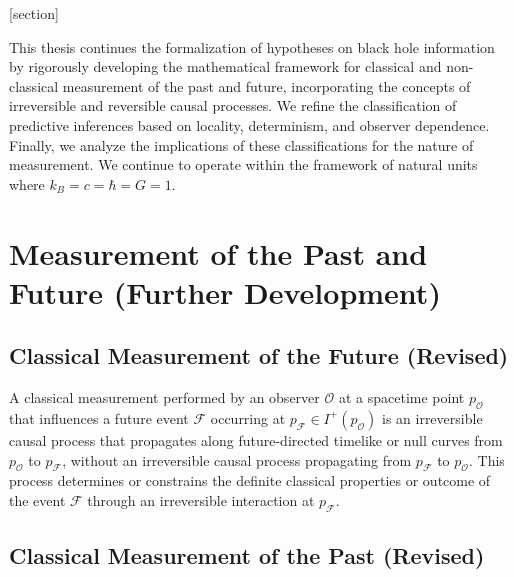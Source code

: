 





\theoremstyle{definition}
[section]
















	
	
		This thesis continues the formalization of hypotheses on black hole information by rigorously developing the mathematical framework for classical and non-classical measurement of the past and future, incorporating the concepts of irreversible and reversible causal processes. We refine the classification of predictive inferences based on locality, determinism, and observer dependence. Finally, we analyze the implications of these classifications for the nature of measurement. We continue to operate within the framework of natural units where $k_B = c = \hbar = G = 1$.

	
	\section{Measurement of the Past and Future (Further Development)}
	
	\subsection{Classical Measurement of the Future (Revised)}
	
	\begin{definition}
		A classical measurement performed by an observer $\mathcal{O}$ at a spacetime point $p_{\mathcal{O}}$ that influences a future event $\mathcal{F}$ occurring at $p_{\mathcal{F}} \in I^+(p_{\mathcal{O}})$ is an irreversible causal process that propagates along future-directed timelike or null curves from $p_{\mathcal{O}}$ to $p_{\mathcal{F}}$, without an irreversible causal process propagating from $p_{\mathcal{F}}$ to $p_{\mathcal{O}}$. This process determines or constrains the definite classical properties or outcome of the event $\mathcal{F}$ through an irreversible interaction at $p_{\mathcal{F}}$.
	\end{definition}
	
	\subsection{Classical Measurement of the Past (Revised)}
	
